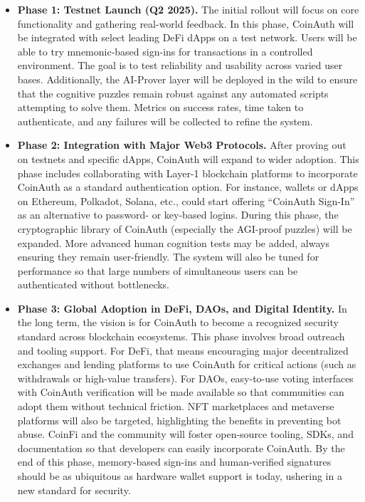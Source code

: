 \documentclass[10pt,letterpaper]{article}
\begin{document}
\begin{itemize}
    \item \textbf{Phase 1: Testnet Launch (Q2 2025).} The initial rollout will focus on core functionality and gathering real-world feedback. In this phase, CoinAuth will be integrated with select leading DeFi dApps on a test network. Users will be able to try mnemonic-based sign-ins for transactions in a controlled environment. The goal is to test reliability and usability across varied user bases. Additionally, the AI-Prover layer will be deployed in the wild to ensure that the cognitive puzzles remain robust against any automated scripts attempting to solve them. Metrics on success rates, time taken to authenticate, and any failures will be collected to refine the system.
    \item \textbf{Phase 2: Integration with Major Web3 Protocols.} After proving out on testnets and specific dApps, CoinAuth will expand to wider adoption. This phase includes collaborating with Layer-1 blockchain platforms to incorporate CoinAuth as a standard authentication option. For instance, wallets or dApps on Ethereum, Polkadot, Solana, etc., could start offering “CoinAuth Sign-In” as an alternative to password- or key-based logins. During this phase, the cryptographic library of CoinAuth (especially the AGI-proof puzzles) will be expanded. More advanced human cognition tests may be added, always ensuring they remain user-friendly. The system will also be tuned for performance so that large numbers of simultaneous users can be authenticated without bottlenecks.
    \item \textbf{Phase 3: Global Adoption in DeFi, DAOs, and Digital Identity.} In the long term, the vision is for CoinAuth to become a recognized security standard across blockchain ecosystems. This phase involves broad outreach and tooling support. For DeFi, that means encouraging major decentralized exchanges and lending platforms to use CoinAuth for critical actions (such as withdrawals or high-value transfers). For DAOs, easy-to-use voting interfaces with CoinAuth verification will be made available so that communities can adopt them without technical friction. NFT marketplaces and metaverse platforms will also be targeted, highlighting the benefits in preventing bot abuse. CoinFi and the community will foster open-source tooling, SDKs, and documentation so that developers can easily incorporate CoinAuth. By the end of this phase, memory-based sign-ins and human-verified signatures should be as ubiquitous as hardware wallet support is today, ushering in a new standard for security.
\end{itemize}
\end{document}
